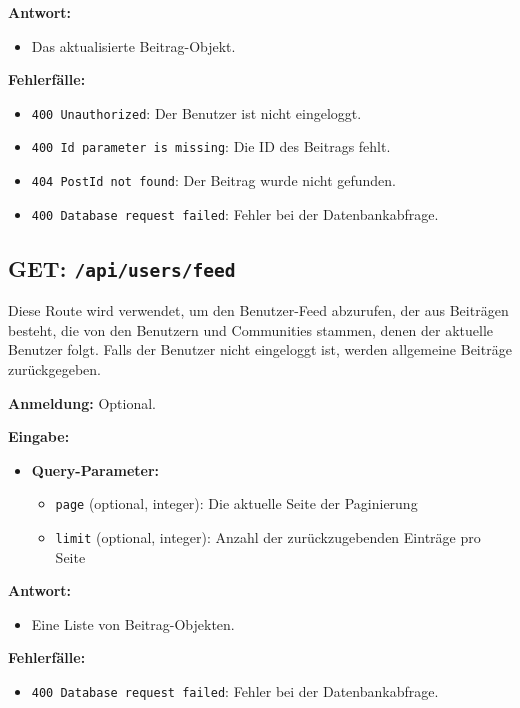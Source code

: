 \documentclass[a4paper,12pt]{article}
\begin{document}
\textbf{Antwort:}
\begin{itemize}
    \item Das aktualisierte Beitrag-Objekt.
\end{itemize}

\textbf{Fehlerfälle:}
\begin{itemize}
    \item \texttt{400 Unauthorized}:
        Der Benutzer ist nicht eingeloggt.
    \item \texttt{400 Id parameter is missing}:
        Die ID des Beitrags fehlt.
    \item \texttt{404 PostId not found}:
        Der Beitrag wurde nicht gefunden.
    \item \texttt{400 Database request failed}:
        Fehler bei der Datenbankabfrage.
\end{itemize}

\newpage
\subsection{GET: \texttt{/api/users/feed}}

Diese Route wird verwendet, um den Benutzer-Feed abzurufen, der aus Beiträgen
besteht, die von den Benutzern und Communities stammen, denen der aktuelle
Benutzer folgt. Falls der Benutzer nicht eingeloggt ist, werden allgemeine
Beiträge zurückgegeben.

\textbf{Anmeldung:} Optional.

\textbf{Eingabe:}
\begin{itemize}
    \item \textbf{Query-Parameter:}
    \begin{itemize}
        \item \texttt{page} (optional, integer):
            Die aktuelle Seite der Paginierung
        \item \texttt{limit} (optional, integer):
            Anzahl der zurückzugebenden Einträge pro Seite
    \end{itemize}
\end{itemize}

\textbf{Antwort:}
\begin{itemize}
    \item Eine Liste von Beitrag-Objekten.
\end{itemize}

\textbf{Fehlerfälle:}
\begin{itemize}
    \item \texttt{400 Database request failed}: Fehler bei der Datenbankabfrage.
\end{itemize}
\end{document}
